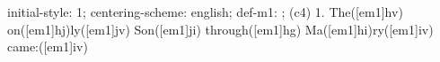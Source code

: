 initial-style: 1;
centering-scheme: english;
def-m1: \grealign;
(c4) 1. The([em1]hv) on([em1]hj)ly([em1]jv) Son([em1]ji) through([em1]hg) Ma([em1]hi)ry([em1]iv) came:([em1]iv)